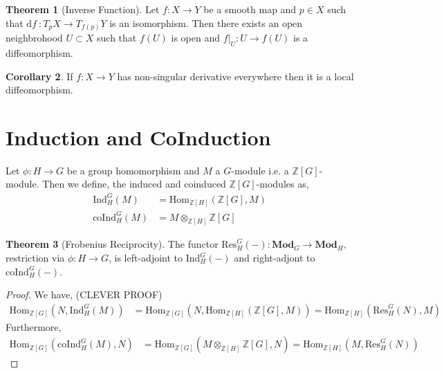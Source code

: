 \documentclass[12pt]{extarticle}
\newcommand{\Hom}[3]{\mathrm{Hom}_{#1}\left( #2, #3 \right)}
\newcommand{\Z}{\mathbb{Z}}
\renewcommand{\d}[1]{ \mathrm{d}#1 \:}
\theoremstyle{definition}
\newtheorem{theorem}{Theorem}[section]
\newtheorem{corollary}[theorem]{Corollary}
\newenvironment{definition}[1][Definition:]{\begin{trivlist}
\item[\hskip \labelsep {\bfseries #1}]}{\end{trivlist}}
\begin{document}
\begin{theorem}[Inverse Function]
Let $f : X \to Y$ be a smooth map and $p \in X$ such that $\d{f} : T_p X \to T_{f(p)} Y$ is an isomorphism. Then there exists an open neighbrohood $U \subset X$ such that $f(U)$ is open and $f|_U : U \to f(U)$ is a diffeomorphism. 
\end{theorem}

\begin{corollary}
If $f : X \to Y$ has non-singular derivative everywhere then it is a local diffeomorphism.
\end{corollary}


\section{Induction and CoInduction}


\newcommand{\Gal}[1]{\mathrm{Gal}\left( #1 \right)}
\newcommand{\Nm}{\mathrm{Nm}}
\newcommand{\Ind}[3]{\mathrm{Ind}^{#1}_{#2} \left(#3\right)}
\newcommand{\coInd}[3]{\mathrm{coInd}^{#1}_{#2} \left(#3\right)}
\newcommand{\Res}[3]{\mathrm{Res}^{#1}_{#2} \left( #3 \right)}
\newcommand{\Mod}{\mathbf{Mod}}


\begin{definition}
Let $\phi : H \to G$ be a group homomorphism and $M$ a $G$-module i.e. a $\Z[G]$-module. Then we define, the induced and coinduced $\Z[G]$-modules as,
\begin{align*}
\Ind{G}{H}{M} & = \Hom{\Z[H]}{\Z[G]}{M}
\\
\coInd{G}{H}{M} & = M \otimes_{\Z[H]} \Z[G] 
\end{align*}
\end{definition}

\begin{theorem}[Frobenius Reciprocity]
The functor $\Res{G}{H}{-} : \Mod_{G} \to \Mod_{H}$, restriction via $\phi : H \to G$, is left-adjoint to $\Ind{G}{H}{-}$ and right-adjont to $\coInd{G}{H}{-}$. 
\end{theorem}

\begin{proof}
We have, (CLEVER PROOF)
\begin{align*}
\Hom{\Z[G]}{N}{\Ind{G}{H}{M}} & = \Hom{\Z[G]}{N}{\Hom{\Z[H]}{\Z[G]}{M}} = \Hom{\Z[H]}{\Res{G}{H}{N}}{M}
\end{align*}
Furthermore,
\begin{align*}
\Hom{\Z[G]}{\coInd{G}{H}{M}}{N} & = \Hom{\Z[G]}{M \otimes_{\Z[H]} \Z[G]}{N} = \Hom{\Z[H]}{M}{\Res{G}{H}{N}}
\end{align*}
\end{proof}
\end{document}
